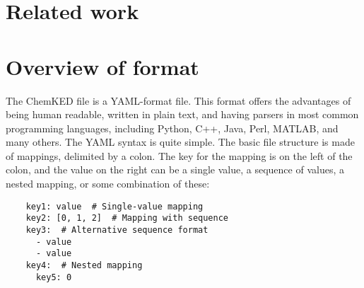 \documentclass[12pt]{ussci}
\newcommand\ck{ChemKED}
\begin{document}
\section{Related work}
%


\section{Overview of format}\label{sec:overview-of-format}

The \ck{} file is a YAML-format file. This format offers the advantages of being
human readable, written in plain text, and having parsers in most common
programming languages, including Python, C++, Java, Perl, MATLAB, and many
others. The YAML syntax is quite simple. The basic file structure is made of
mappings, delimited by a colon. The key for the mapping is on the left of the
colon, and the value on the right can be a single value, a sequence of values,
a nested mapping, or some combination of these:

\begin{verbatim}
    key1: value  # Single-value mapping
    key2: [0, 1, 2]  # Mapping with sequence
    key3:  # Alternative sequence format
      - value
      - value
    key4:  # Nested mapping
      key5: 0
\end{verbatim}
\end{document}
